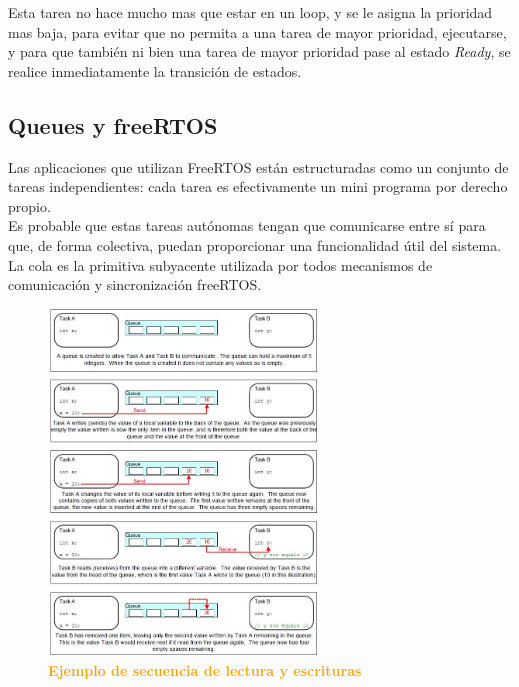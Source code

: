 \documentclass{article}
\begin{document}
Esta tarea no hace mucho mas que estar en un loop, y se le asigna la prioridad mas baja, para evitar que no permita a una tarea de mayor prioridad, ejecutarse, y para que también ni bien una tarea de mayor prioridad pase al estado \textit{Ready}, se realice
inmediatamente la transición de estados. \\

\subsection{Queues y freeRTOS}

Las aplicaciones que utilizan FreeRTOS están estructuradas como un conjunto de tareas independientes: cada tarea es efectivamente un mini programa por derecho propio.\\

Es probable que estas tareas autónomas tengan que comunicarse entre sí para que, de forma colectiva, puedan proporcionar una funcionalidad útil del sistema. \\

La cola es la primitiva subyacente utilizada por todos mecanismos de comunicación y sincronización freeRTOS.\\

\begin{figure}[H]
   \centering
   \includegraphics[width=0.65\textwidth]{figures/queue.jpg}
   \centering
   \caption{\textbf{\textcolor{Orange}{Ejemplo de secuencia de lectura y escrituras}}}
\end{figure}
\end{document}
